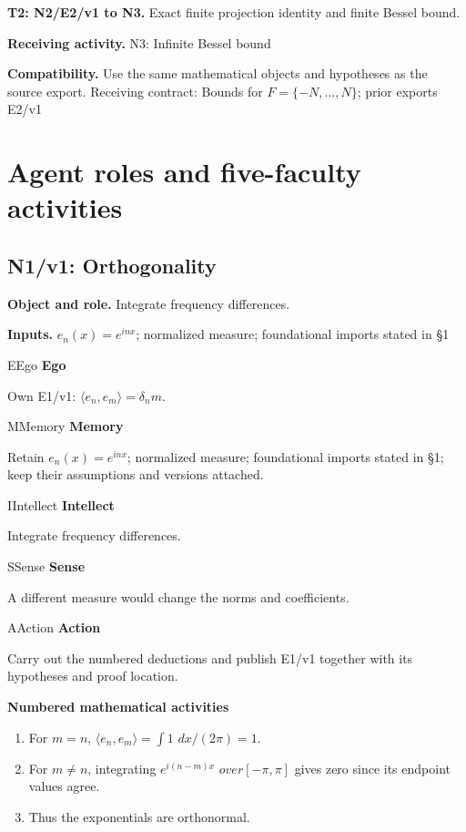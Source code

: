 \documentclass[preprint,12pt,aps,pra,showkeys,amsmath,amssymb,superscriptaddress,floatfix]{revtex4-2}
\theoremstyle{definition}
\theoremstyle{remark}
\newcommand{\mmfaculty}[3]{%
 \begin{mmfacultybox}{#1}{#2}
 {\sffamily\bfseries\color{MMBlue}#2}\par\smallskip #3
 \end{mmfacultybox}}
\newcommand{\field}[2]{\par\smallskip\noindent\textbf{#1.} #2\par}
\begin{document}
\field{T2: N2/E2/v1 to N3}{Exact finite projection identity and finite Bessel bound.}

\field{Receiving activity}{N3: Infinite Bessel bound}

\field{Compatibility}{Use the same mathematical objects and hypotheses as the source export.
Receiving contract: Bounds for \(F=\{-N,\ldots ,N\}\); prior exports
E2/v1}

\endgroup

\clearpage\section{Agent roles and five-faculty activities}\begingroup\small\linespread{1.05}\selectfont{}

\subsection{N1/v1: Orthogonality}

\field{Object and role}{Integrate frequency differences.}

\field{Inputs}{\(e_n(x)=e^{inx}\); normalized measure; foundational imports stated in
§1}

\mmfaculty{E}{Ego}{Own E1/v1: \(\langle e_n,e_m\rangle =\delta _nm\).}

\mmfaculty{M}{Memory}{Retain \(e_n(x)=e^{inx}\); normalized measure; foundational imports
stated in §1; keep their assumptions and versions attached.}

\mmfaculty{I}{Intellect}{Integrate frequency differences.}

\mmfaculty{S}{Sense}{A different measure would change the norms and coefficients.}

\mmfaculty{A}{Action}{Carry out the numbered deductions and publish E1/v1 together with its
hypotheses and proof location.}

\smallskip\noindent\textbf{Numbered mathematical activities}

\begin{enumerate}[label=N1.\arabic*,leftmargin=3.4em]

\item For \(m=n\), \(\langle e_n,e_m\rangle =\int 1\) \(dx/(2\pi )=1\).

\item For \(m\ne n\), integrating \(e^{i(n-m)x}\) \(over[-\pi ,\pi ]\) gives
zero since its endpoint values agree.

\item Thus the exponentials are orthonormal.

\end{enumerate}
\end{document}
